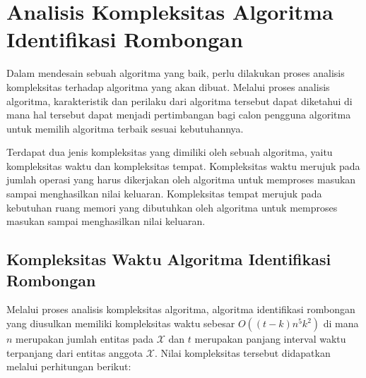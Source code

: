 \section{Analisis Kompleksitas Algoritma Identifikasi Rombongan}
\label{subsec:complexity}

Dalam mendesain sebuah algoritma yang baik, perlu dilakukan proses analisis kompleksitas terhadap algoritma yang akan dibuat. Melalui proses analisis algoritma, karakteristik dan perilaku dari algoritma tersebut dapat diketahui di mana hal tersebut dapat menjadi pertimbangan bagi calon pengguna algoritma untuk memilih algoritma terbaik sesuai kebutuhannya.

Terdapat dua jenis kompleksitas yang dimiliki oleh sebuah algoritma, yaitu kompleksitas waktu dan kompleksitas tempat. Kompleksitas waktu merujuk pada jumlah operasi yang harus dikerjakan oleh algoritma untuk memproses masukan sampai menghasilkan nilai keluaran. Kompleksitas tempat merujuk pada kebutuhan ruang memori yang dibutuhkan oleh algoritma untuk memproses masukan sampai menghasilkan nilai keluaran.

\subsection{Kompleksitas Waktu Algoritma Identifikasi Rombongan}
\label{subsubsec:time-complexity}

Melalui proses analisis kompleksitas algoritma, algoritma identifikasi rombongan yang diusulkan memiliki kompleksitas waktu sebesar $O((t - k)n^5k^2)$ di mana $n$ merupakan jumlah entitas pada $\mathcal{X}$ dan $t$ merupakan panjang interval waktu terpanjang dari entitas anggota $\mathcal{X}$. Nilai kompleksitas tersebut didapatkan melalui perhitungan berikut:

